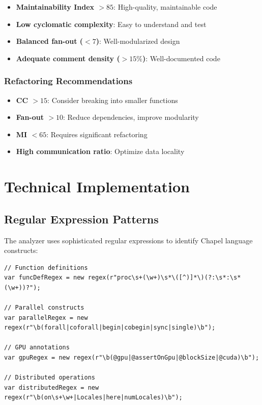 \documentclass[11pt,a4paper]{article}
\begin{document}
\begin{itemize}
    \item \textbf{Maintainability Index $> 85$}: High-quality, maintainable code
    \item \textbf{Low cyclomatic complexity}: Easy to understand and test
    \item \textbf{Balanced fan-out ($< 7$)}: Well-modularized design
    \item \textbf{Adequate comment density ($> 15\%$)}: Well-documented code
\end{itemize}

\subsubsection{Refactoring Recommendations}

\begin{itemize}
    \item \textbf{CC $> 15$}: Consider breaking into smaller functions
    \item \textbf{Fan-out $> 10$}: Reduce dependencies, improve modularity
    \item \textbf{MI $< 65$}: Requires significant refactoring
    \item \textbf{High communication ratio}: Optimize data locality
\end{itemize}

\section{Technical Implementation}

\subsection{Regular Expression Patterns}

The analyzer uses sophisticated regular expressions to identify Chapel language constructs:

\begin{lstlisting}[style=chapel, caption=Key Regular Expressions]
// Function definitions
var funcDefRegex = new regex(r"proc\s+(\w+)\s*\([^)]*\)(?:\s*:\s*(\w+))?");

// Parallel constructs
var parallelRegex = new regex(r"\b(forall|coforall|begin|cobegin|sync|single)\b");

// GPU annotations
var gpuRegex = new regex(r"\b(@gpu|@assertOnGpu|@blockSize|@cuda)\b");

// Distributed operations
var distributedRegex = new regex(r"\b(on\s+\w+|Locales|here|numLocales)\b");
\end{lstlisting}
\end{document}
